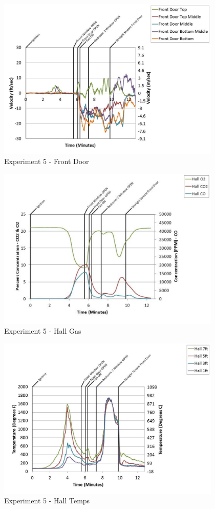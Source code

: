 \documentclass{article}
\begin{document}
\begin{appendices}
	\clearpage

	\begin{figure}[h!]
		\centering
		\includegraphics[height=3.05in]{0_Images/Results_Charts/Exp_5_Charts/FrontDoor.pdf}
		\caption{Experiment 5 - Front Door}
	\end{figure}
 

	\begin{figure}[h!]
		\centering
		\includegraphics[height=3.05in]{0_Images/Results_Charts/Exp_5_Charts/HallGas.pdf}
		\caption{Experiment 5 - Hall Gas}
	\end{figure}
 
	\clearpage

	\begin{figure}[h!]
		\centering
		\includegraphics[height=3.05in]{0_Images/Results_Charts/Exp_5_Charts/HallTemps.pdf}
		\caption{Experiment 5 - Hall Temps}
	\end{figure}
 


\end{appendices}
\end{document}
